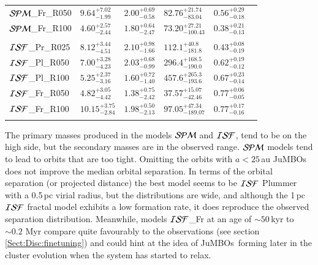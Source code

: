 \documentclass[submission,phys]{lib/SciPost}
\newcommand{\jumbos}{\mbox{JuMBOs}}
\begin{document}
\begin{table}
\begin{tabular}{llllll}
 ${\cal SPM}$\_Fr\_R050 & $9.64^{+7.02}_{-1.99}$ & $2.00^{+0.69}_{-0.58}$ & $82.76^{+21.74}_{-83.04}$ & $0.56^{+0.29}_{-0.18}$ \vspace{0.25em}\\ 
 ${\cal SPM}$\_Fr\_R100 & $4.60^{+2.57}_{-2.44}$ & $1.80^{+0.64}_{-2.47}$ & $73.20^{+27.21}_{-100.43}$ & $0.38^{+0.21}_{-0.13}$ \vspace{0.25em}\\
 \hline \vspace{-0.75em} \\ 
 ${\cal ISF}$\_Pr\_R025 & $8.12^{+3.44}_{-4.51}$ & $2.10^{+0.98}_{-1.66}$ & $112.1^{+40.8}_{-181.8}$ & $0.43^{+0.08}_{-0.19}$ \vspace{0.25em}\\
 ${\cal ISF}$\_Pl\_R050 & $7.00^{+3.28}_{-4.23}$ & $2.03^{+0.68}_{-0.99}$ & $296.4^{+168.5}_{-190.0}$ & $0.62^{+0.19}_{-0.12}$ \vspace{0.25em}\\
 ${\cal ISF}$\_Pl\_R100 & $5.25^{+2.37}_{-3.16}$ & $1.60^{+0.72}_{-1.40}$ & $457.6^{+265.3}_{-193.6}$ & $0.67^{+0.23}_{-0.14}$ \vspace{0.25em}\\
 ${\cal ISF}$\_Fr\_R050 & $4.82^{+3.05}_{-4.42}$ & $1.38^{+0.75}_{-2.42}$ & $37.57^{+15.07}_{-42.46}$ & $0.77^{+0.06}_{-0.05}$ \vspace{0.25em}\\  
 ${\cal ISF}$\_Fr\_R100 &$10.15^{+3.75}_{-2.84}$ & $1.98^{+0.50}_{-2.13}$ & $97.05^{+47.34}_{-189.07}$ & $0.77^{+0.17}_{-0.16}$ \vspace{0.25em}\\
 \hline \vspace{-0.75em} \\ 
 \end{tabular}
\end{table}

The primary masses produced in the models ${\cal SPM}$ and ${\cal
  ISF}$, tend to be on the high side, but the secondary masses are in
the observed range. ${\cal SPM}$ models tend to lead to orbits that
are too tight. Omitting the orbits with $a<25$\,au \jumbos\, does not
improve the median orbital separation.  In terms of the orbital
separation (or projected distance) the best model seems to be ${\cal
  ISF}$ Plummer with a 0.5\,pc virial radius, but the distributions
are wide, and although the 1\,pc ${\cal ISF}$ fractal model exhibits a
low formation rate, it does reproduce the observed separation
distribution. Meanwhile, models ${\cal ISF}$\_Fr at an age of
$\sim50$\,kyr to $\sim0.2$ Myr compare quite favourably to the
observations (see section\,\ref{Sect:Disc:finetuning}) and could hint
at the idea of \jumbos\ forming later in the cluster evolution when
the system has started to relax.
\end{document}

